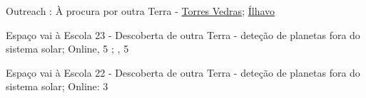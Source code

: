 
\begin{rubric}{Outreach}
\entry*[2023] 
	: À procura por outra Terra - \href{https://divulgacao.iastro.pt/pt/evento/ignite-iastro-torres-vedras/}{Torres Vedras}; \href{https://divulgacao.iastro.pt/en/evento/ignite-iastro-ilhavo-en/}{Ílhavo}

\entry*[2023] 
	Espaço vai à Escola 23 - Descoberta de outra Terra - deteção de planetas fora do sistema solar; Online, 5 ; , 5 

\entry*[2022] 
	Espaço vai à Escola 22 - Descoberta de outra Terra - deteção de planetas fora do sistema solar; Online: 3 
\end{rubric}